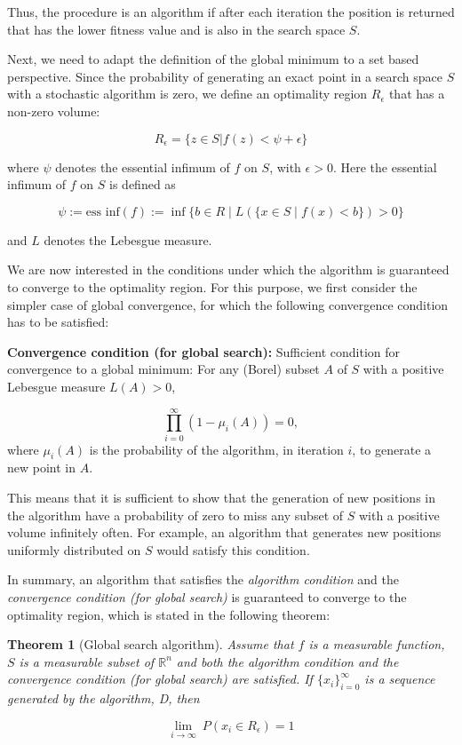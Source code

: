 \documentclass[
  oneside, a4paper, 12pt, openany]{book}
\newtheorem{theorem}{Theorem}[chapter]
\theoremstyle{definition}
\theoremstyle{definition}
\theoremstyle{definition}
\theoremstyle{definition}
\theoremstyle{remark}
\begin{document}
Thus, the procedure is an algorithm if after each iteration the position is returned that has the lower fitness value and is also in the search space \(S\).

Next, we need to adapt the definition of the global minimum to a set based perspective. Since the probability of generating an exact point in a search space \(S\) with a stochastic algorithm is zero, we define an optimality region \(R_{\epsilon}\) that has a non-zero volume:

\[
 R_{\epsilon} = \{z\in S| f(z) < \psi + \epsilon\}
\]

where \(\psi\) denotes the essential infimum of \(f\) on \(S\), with \(\epsilon > 0\). Here the essential infimum of \(f\) on \(S\) is defined as

\[
\psi := \text{ess inf} (f) := \inf \{ b \in R \mid L (\{ x \in S \mid f(x) < b\}) > 0 \} 
\]

and \(L\) denotes the Lebesgue measure.

We are now interested in the conditions under which the algorithm is guaranteed to converge to the optimality region. For this purpose, we first consider the simpler case of global convergence, for which the following convergence condition has to be satisfied:

\textbf{Convergence condition (for global search):} Sufficient condition for convergence to a global minimum: For any (Borel) subset \(A\) of \(S\) with a positive Lebesgue measure \(L(A)>0\),

\[
  \prod_{i=0}^\infty (1-\mu_i(A)) = 0,
\]
where \(\mu_i(A)\) is the probability of the algorithm, in iteration \(i\), to generate a new point in \(A\).

This means that it is sufficient to show that the generation of new positions in the algorithm have a probability of zero to miss any subset of \(S\) with a positive volume infinitely often. For example, an algorithm that generates new positions uniformly distributed on \(S\) would satisfy this condition.

In summary, an algorithm that satisfies the \emph{algorithm condition} and the \emph{convergence condition (for global search)} is guaranteed to converge to the optimality region, which is stated in the following theorem:

\begin{theorem}[Global search algorithm]
Assume that \(f\) is a measurable function, \(S\) is a measurable subset of \(\mathbb{R}^n\) and both the algorithm condition and the convergence condition (for global search) are satisfied. If \(\{x_i\}^{\infty}_{i=0}\) is a sequence generated by the algorithm, D, then

\[
  \lim_{i\rightarrow \infty} \ P(x_i \in R_{\epsilon}) = 1
\]
\end{theorem}
\end{document}

